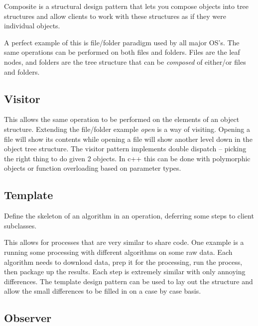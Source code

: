 \documentclass{article}
\begin{document}
\begin{displayquote}
Composite is a structural design pattern that lets you compose objects into tree structures and allow clients to work with these structures as if they were individual objects. \cite {guru}
\end{displayquote}

A perfect example of this is file/folder paradigm used by all major OS's. The same operations can be performed
on both files and folders. Files are the leaf nodes, and folders are the tree structure that can be \emph{composed}
of either/or files and folders.

\subsection{Visitor}

This allows the same operation to be performed on the elements of an object structure. Extending the file/folder example \emph{open}
is a way of visiting. Opening a file will show its contents while opening a file will show another level down in the object tree
structure. The visitor pattern implements double dispatch -- picking the right thing to do given 2 objects. In c++ this can be
done with polymorphic objects or function overloading based on parameter types.

\subsection{Template}

\begin{displayquote}
Define the skeleton of an algorithm in an operation, deferring some steps to client subclasses. \cite{guru}
\end{displayquote}

This allows for processes that are very similar to share code. One example is a running some processing
with different algorithms on some raw data. Each algorithm needs to download data, prep it for the processing,
run the process, then package up the results. Each step is extremely similar with only annoying differences.
The template design pattern can be used to lay out the structure and allow the small differences to be filled in
on a case by case basis.

\subsection{Observer}
\end{document}
